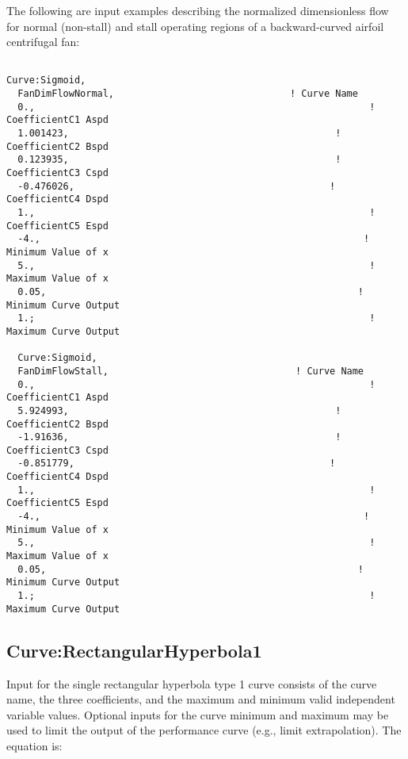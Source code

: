 The following are input examples describing the normalized dimensionless flow for normal (non-stall) and stall operating regions of a backward-curved airfoil centrifugal fan:

\begin{lstlisting}

Curve:Sigmoid,
  FanDimFlowNormal,                               ! Curve Name
  0.,                                                           ! CoefficientC1 Aspd
  1.001423,                                               ! CoefficientC2 Bspd
  0.123935,                                               ! CoefficientC3 Cspd
  -0.476026,                                             ! CoefficientC4 Dspd
  1.,                                                           ! CoefficientC5 Espd
  -4.,                                                         ! Minimum Value of x
  5.,                                                           ! Maximum Value of x
  0.05,                                                       ! Minimum Curve Output
  1.;                                                           ! Maximum Curve Output

  Curve:Sigmoid,
  FanDimFlowStall,                                 ! Curve Name
  0.,                                                           ! CoefficientC1 Aspd
  5.924993,                                               ! CoefficientC2 Bspd
  -1.91636,                                               ! CoefficientC3 Cspd
  -0.851779,                                             ! CoefficientC4 Dspd
  1.,                                                           ! CoefficientC5 Espd
  -4.,                                                         ! Minimum Value of x
  5.,                                                           ! Maximum Value of x
  0.05,                                                       ! Minimum Curve Output
  1.;                                                           ! Maximum Curve Output
\end{lstlisting}

\subsection{Curve:RectangularHyperbola1}\label{curverectangularhyperbola1}

Input for the single rectangular hyperbola type 1 curve consists of the curve name, the three coefficients, and the maximum and minimum valid independent variable values. Optional inputs for the curve minimum and maximum may be used to limit the output of the performance curve (e.g., limit extrapolation). The equation is:

